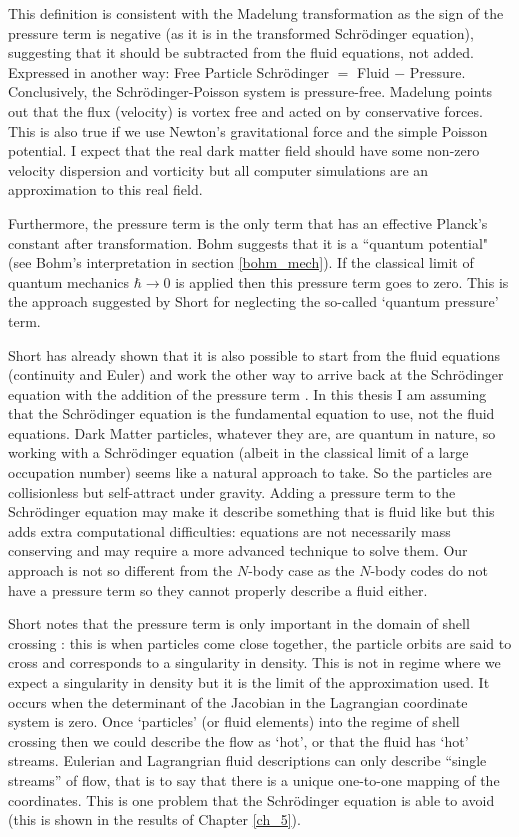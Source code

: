 \noindent This definition is consistent with the Madelung transformation as the sign of the pressure term is negative (as it is in the transformed Schr\"odinger equation), suggesting that it should be subtracted from the fluid equations, not added. Expressed in another way: Free Particle Schr\"odinger $=$ Fluid $-$ Pressure. Conclusively, the Schr\"odinger-Poisson system is pressure-free. Madelung points out that the flux (velocity) is vortex free and acted on by conservative forces. This is also true if we use Newton's gravitational force and the simple Poisson potential. I expect that the real dark matter field should have some non-zero velocity dispersion and vorticity but all computer simulations are an approximation to this real field.

Furthermore, the pressure term is the only term that has an effective Planck's constant after transformation. Bohm suggests that it is a ``quantum potential" (see Bohm's interpretation in section \ref{bohm_mech}). If the classical limit of quantum mechanics $\hbar \rightarrow 0$ is applied then this pressure term goes to zero. This is the approach suggested by Short \citep{bib_short} for neglecting the so-called `quantum pressure' term.

Short has already shown that it is also possible to start from the fluid equations (continuity and Euler) and work the other way to arrive back at the Schr\"odinger equation with the addition of the pressure term \citep{bib_short}. In this thesis I am assuming that the Schr\"odinger equation is the fundamental equation to use, not the fluid equations. Dark Matter particles, whatever they are, are quantum in nature, so working with a Schr\"odinger equation (albeit in the classical limit of a large occupation number) seems like a natural approach to take. So the particles are collisionless but self-attract under gravity. Adding a pressure term to the Schr\"odinger equation may make it describe something that is fluid like but this adds extra computational difficulties: equations are not necessarily mass conserving and may require a more advanced technique to solve them. Our approach is not so different from the $N$-body case as the $N$-body codes do not have a pressure term so they cannot properly describe a fluid either.

Short notes that the pressure term is only important in the domain of shell crossing \citep{bib_short}: this is when particles come close together, the particle orbits are said to cross and corresponds to a singularity in density. This is not in regime where we expect a singularity in density but it is the limit of the approximation used. It occurs when the determinant of the Jacobian in the Lagrangian coordinate system is zero. Once `particles' (or fluid elements) into the regime of shell crossing then we could describe the flow as `hot', or that the fluid has `hot' streams. Eulerian and Lagrangrian fluid descriptions can only describe ``single streams'' of flow, that is to say that there is a unique one-to-one mapping of the coordinates. This is one problem that the Schr\"odinger equation is able to avoid (this is shown in the results of Chapter \ref{ch_5}).

